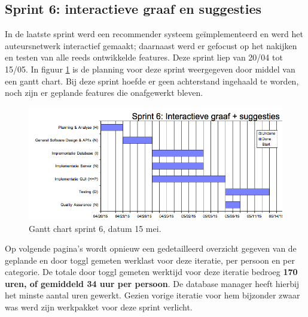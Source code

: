 \documentclass{article}
\begin{document}


\clearpage
\subsection{Sprint 6:  interactieve graaf en suggesties}
In de laatste sprint werd een recommender systeem ge\"implementeerd en werd het auteursnetwerk interactief gemaakt; daarnaast werd er gefocust op het nakijken en testen van alle reeds ontwikkelde features. Deze sprint liep van 20/04 tot 15/05. In figuur \ref{gantt_S6} is de planning voor deze sprint weergegeven door middel van een gantt chart. Bij deze sprint hoefde er geen achterstand ingehaald te worden, noch zijn er geplande features die onafgewerkt bleven. 

\begin{figure}[h!]
\centering
 \centerline{\includegraphics[width=150mm]{Gantt_S6_15mei.png}}
 \label{gantt_S6}
 \caption{Gantt chart sprint 6, datum 15 mei. }
\end{figure}

\noindent Op volgende pagina's wordt opnieuw een gedetailleerd overzicht gegeven van de geplande en door toggl gemeten werklast voor deze iteratie, per persoon en per categorie. De totale door toggl gemeten werktijd voor deze iteratie bedroeg \textbf{170 uren, of gemiddeld 34 uur per persoon}. De database manager heeft hierbij het minste aantal uren gewerkt. Gezien vorige iteratie voor hem bijzonder zwaar was werd zijn werkpakket voor deze sprint verlicht.



\end{document}
